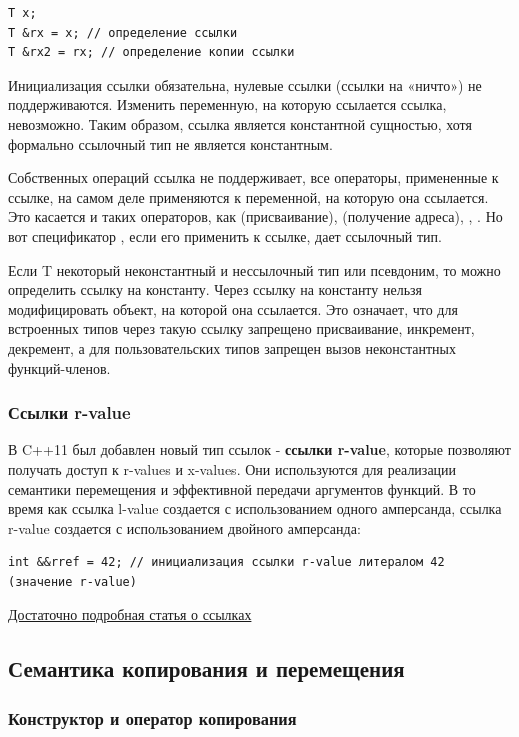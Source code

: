 \begin{verbatim}
T x;
T &rx = x; // определение ссылки
T &rx2 = rx; // определение копии ссылки
\end{verbatim}

Инициализация ссылки обязательна, нулевые ссылки (ссылки на «ничто») не поддерживаются. Изменить переменную, на которую ссылается ссылка, невозможно. Таким образом, ссылка является константной сущностью, хотя формально ссылочный тип не является константным.

Собственных операций ссылка не поддерживает, все операторы, примененные к ссылке, на самом деле применяются к переменной, на которую она ссылается. Это касается и таких операторов, как \mverb{=} (присваивание), \mverb{&} (получение адреса), , . Но вот спецификатор , если его применить к ссылке, дает ссылочный тип.

Если T некоторый неконстантный и нессылочный тип или псевдоним, то можно определить ссылку на константу. Через ссылку на константу нельзя модифицировать объект, на которой она ссылается. Это означает, что для встроенных типов через такую ссылку запрещено присваивание, инкремент, декремент, а для пользовательских типов запрещен вызов неконстантных функций-членов.

\subsubsection*{Ссылки r-value}

В C++11 был добавлен новый тип ссылок - \textbf{ссылки r-value}, которые позволяют получать доступ к r-values и x-values. Они используются для реализации семантики перемещения и эффективной передачи аргументов функций. В то время как ссылка l-value создается с использованием одного амперсанда, ссылка r-value создается с использованием двойного амперсанда:

\begin{verbatim}
int &&rref = 42; // инициализация ссылки r-value литералом 42 (значение r-value)
\end{verbatim}

\href{https://habr.com/ru/articles/646005/}{Достаточно подробная статья о ссылках}

\subsection{Семантика копирования и перемещения}

\subsubsection{Конструктор и оператор копирования}

